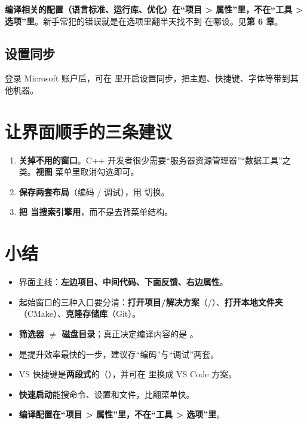 \begin{warnbox}[注意]
\textbf{编译相关的配置（语言标准、运行库、优化）在“项目 > 属性”里，不在“工具 > 选项”里}。新手常犯的错误就是在选项里翻半天找不到  在哪设。见\textbf{第 6 章}。
\end{warnbox}

\subsection{设置同步}

登录 Microsoft 账户后，可在  里开启设置同步，把主题、快捷键、字体等带到其他机器。

\section{让界面顺手的三条建议}

\begin{enumerate}
	\item \textbf{关掉不用的窗口}。C++ 开发者很少需要“服务器资源管理器”“数据工具”之类。\textbf{视图} 菜单里取消勾选即可。
	\item \textbf{保存两套布局}（编码 / 调试），用  切换。
	\item \textbf{把  当搜索引擎用}，而不是去背菜单结构。
\end{enumerate}

\section{小结}

\begin{itemize}
	\item 界面主线：\textbf{左边项目、中间代码、下面反馈、右边属性}。
	\item 起始窗口的三种入口要分清：\textbf{打开项目/解决方案}（/）、\textbf{打开本地文件夹}（CMake）、\textbf{克隆存储库}（Git）。
	\item \textbf{筛选器 $\neq$ 磁盘目录}；真正决定编译内容的是 。
	\item {} 是提升效率最快的一步，建议存“编码”与“调试”两套。
	\item VS 快捷键是\textbf{两段式}的（），并可在  里换成 VS Code 方案。
	\item \textbf{ 快速启动}能搜命令、设置和文件，比翻菜单快。
	\item \textbf{编译配置在“项目 > 属性”里，不在“工具 > 选项”里}。
\end{itemize}

